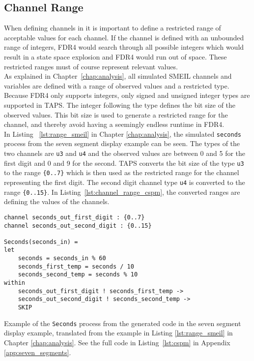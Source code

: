 \subsection{\cspm{} Channel Range}
When defining channels in \cspm{} it is important to define a restricted range of acceptable values for each channel. If the channel is defined with an unbounded range of integers, FDR4 would search through all possible integers which would result in a state space explosion and FDR4 would run out of space. These restricted ranges must of course represent relevant values.\\

As explained in Chapter~\ref{chap:analysis}, all simulated SMEIL channels and variables are defined with a range of observed values and a restricted type.
Because FDR4 only supports integers, only signed and unsigned integer types are supported in TAPS. The integer following the type defines the bit size of the observed values. This bit size is used to generate a restricted range for the \cspm{} channel, and thereby avoid having a seemingly endless runtime in FDR4.\\

In Listing ~\ref{lst:range_smeil} in Chapter \ref{chap:analysis}, the simulated \texttt{seconds} process from the seven segment display example can be seen. The types of the two channels are \texttt{u3} and \texttt{u4} and the observed values are between 0 and 5 for the first digit and 0 and 9 for the second. TAPS converts the bit size of the type \texttt{u3} to the range \texttt{\{0..7\}} which is then used as the restricted range for the \cspm{} channel representing the first digit. The second digit channel type \texttt{u4} is converted to the range \texttt{\{0..15\}}. In Listing~\ref{lst:channel_range_cspm}, the converted ranges are defining the values of the \cspm{} channels.\\

\begin{listing}
\begin{verbatim}
channel seconds_out_first_digit : {0..7}
channel seconds_out_second_digit : {0..15}

Seconds(seconds_in) =
let
    seconds = seconds_in % 60
    seconds_first_temp = seconds / 10
    seconds_second_temp = seconds % 10
within
    seconds_out_first_digit ! seconds_first_temp ->
    seconds_out_second_digit ! seconds_second_temp ->
    SKIP
\end{verbatim}
\caption{Example of the \texttt{Seconds} process from the generated \cspm{} code in the seven segment display example, translated from the example in Listing \ref{lst:range_smeil} in Chapter \ref{chap:analysis}. See the full code in Listing~\ref{lst:cspm} in Appendix \ref{app:seven_segments}.}
\label{lst:channel_range_cspm}
\end{listing}

